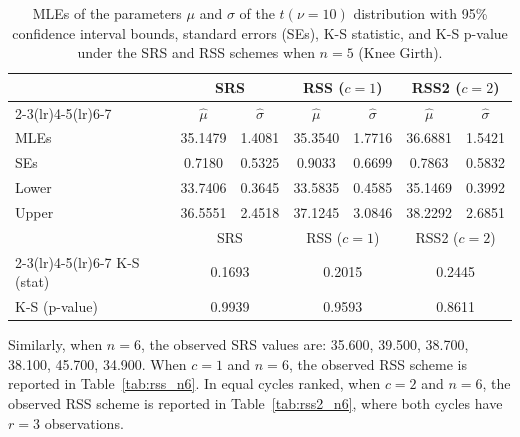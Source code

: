 \documentclass[12pt, a4paper]{article}
\begin{document}
\begin{table}[H]
  \centering
  \caption{MLEs of the parameters $\mu$ and $\sigma$ of the
           $t(\nu=10)$ distribution with 95\% confidence interval bounds,
           standard errors (SEs), K-S statistic, and K-S p-value under
           the SRS and RSS schemes when $n = 5$ (Knee Girth).}
  \label{tab:mle_n5}
  \setlength{\tabcolsep}{6pt}
  \begin{tabular}{lcccccc}
    \toprule
    & \multicolumn{2}{c}{SRS}
    & \multicolumn{2}{c}{RSS ($c = 1$)}
    & \multicolumn{2}{c}{RSS2 ($c = 2$)} \\
    \cmidrule(lr){2-3}\cmidrule(lr){4-5}\cmidrule(lr){6-7}
    & $\hat{\mu}$ & $\hat{\sigma}$
    & $\hat{\mu}$ & $\hat{\sigma}$
    & $\hat{\mu}$ & $\hat{\sigma}$ \\
    \midrule
    MLEs   & 35.1479 & 1.4081 & 35.3540 & 1.7716 & 36.6881 & 1.5421 \\
    SEs    &  0.7180 & 0.5325 &  0.9033 & 0.6699 &  0.7863 & 0.5832 \\
    Lower  & 33.7406 & 0.3645 & 33.5835 & 0.4585 & 35.1469 & 0.3992 \\
    Upper  & 36.5551 & 2.4518 & 37.1245 & 3.0846 & 38.2292 & 2.6851 \\
    \midrule
    & \multicolumn{2}{c}{SRS}
    & \multicolumn{2}{c}{RSS ($c = 1$)}
    & \multicolumn{2}{c}{RSS2 ($c = 2$)} \\
    \cmidrule(lr){2-3}\cmidrule(lr){4-5}\cmidrule(lr){6-7}
    K-S (stat)    & \multicolumn{2}{c}{0.1693}
                  & \multicolumn{2}{c}{0.2015}
                  & \multicolumn{2}{c}{0.2445} \\
    K-S (p-value) & \multicolumn{2}{c}{0.9939}
                  & \multicolumn{2}{c}{0.9593}
                  & \multicolumn{2}{c}{0.8611} \\
    \bottomrule
  \end{tabular}
\end{table}



Similarly, when $n = 6$, the observed SRS values are:
35.600, 39.500, 38.700, 38.100, 45.700, 34.900.
When $c = 1$ and $n = 6$, the observed RSS scheme is reported in
Table~\ref{tab:rss_n6}. In equal cycles ranked, when $c = 2$ and $n = 6$,
the observed RSS scheme is reported in Table~\ref{tab:rss2_n6}, where
both cycles have $r = 3$ observations.
\end{document}

